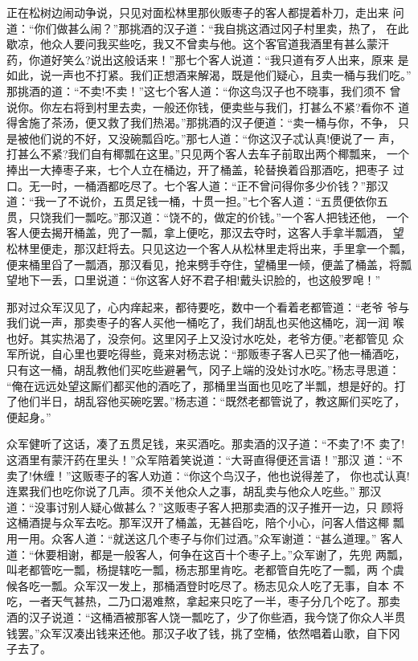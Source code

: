 正在松树边闹动争说，只见对面松林里那伙贩枣子的客人都提着朴刀，走出来
问道：“你们做甚么闹？”那挑酒的汉子道：“我自挑这酒过冈子村里卖，热了，
在此歇凉，他众人要问我买些吃，我又不曾卖与他。这个客官道我酒里有甚么蒙汗
药，你道好笑么?说出这般话来！”那七个客人说道：“我只道有歹人出来，原来
是如此，说一声也不打紧。我们正想酒来解渴，既是他们疑心，且卖一桶与我们吃。”
那挑酒的道：“不卖!不卖！”这七个客人道：“你这鸟汉子也不晓事，我们须不
曾说你。你左右将到村里去卖，一般还你钱，便卖些与我们，打甚么不紧?看你不
道得舍施了茶汤，便又救了我们热渴。”那挑酒的汉子便道：“卖一桶与你，不争，
只是被他们说的不好，又没碗瓢舀吃。”那七人道：“你这汉子忒认真!便说了一
声，打甚么不紧?我们自有椰瓢在这里。”只见两个客人去车子前取出两个椰瓢来，
一个捧出一大捧枣子来，七个人立在桶边，开了桶盖，轮替换着舀那酒吃，把枣子
过口。无一时，一桶酒都吃尽了。七个客人道：“正不曾问得你多少价钱？”那汉
道：“我一了不说价，五贯足钱一桶，十贯一担。”七个客人道：“五贯便依你五
贯，只饶我们一瓢吃。”那汉道：“饶不的，做定的价钱。”一个客人把钱还他，
一个客人便去揭开桶盖，兜了一瓢，拿上便吃，那汉去夺时，这客人手拿半瓢酒，
望松林里便走，那汉赶将去。只见这边一个客人从松林里走将出来，手里拿一个瓢，
便来桶里舀了一瓢酒，那汉看见，抢来劈手夺住，望桶里一倾，便盖了桶盖，将瓢
望地下一丢，口里说道：“你这客人好不君子相!戴头识脸的，也这般罗唣！”

那对过众军汉见了，心内痒起来，都待要吃，数中一个看着老都管道：“老爷
爷与我们说一声，那卖枣子的客人买他一桶吃了，我们胡乱也买他这桶吃，润一润
喉也好。其实热渴了，没奈何。这里冈子上又没讨水吃处，老爷方便。”老都管见
众军所说，自心里也要吃得些，竟来对杨志说：“那贩枣子客人已买了他一桶酒吃，
只有这一桶，胡乱教他们买吃些避暑气，冈子上端的没处讨水吃。”杨志寻思道：
“俺在远远处望这厮们都买他的酒吃了，那桶里当面也见吃了半瓢，想是好的。打
了他们半日，胡乱容他买碗吃罢。”杨志道：“既然老都管说了，教这厮们买吃了，
便起身。”

众军健听了这话，凑了五贯足钱，来买酒吃。那卖酒的汉子道：“不卖了!不
卖了!这酒里有蒙汗药在里头！”众军陪着笑说道：“大哥直得便还言语！”那汉
道：“不卖了!休缠！”这贩枣子的客人劝道：“你这个鸟汉子，他也说得差了，
你也忒认真!连累我们也吃你说了几声。须不关他众人之事，胡乱卖与他众人吃些。”
那汉道：“没事讨别人疑心做甚么？”这贩枣子客人把那卖酒的汉子推开一边，只
顾将这桶酒提与众军去吃。那军汉开了桶盖，无甚舀吃，陪个小心，问客人借这椰
瓢用一用。众客人道：“就送这几个枣子与你们过酒。”众军谢道：“甚么道理。”
客人道：“休要相谢，都是一般客人，何争在这百十个枣子上。”众军谢了，先兜
两瓢，叫老都管吃一瓢，杨提辖吃一瓢，杨志那里肯吃。老都管自先吃了一瓢，两
个虞候各吃一瓢。众军汉一发上，那桶酒登时吃尽了。杨志见众人吃了无事，自本
不吃，一者天气甚热，二乃口渴难熬，拿起来只吃了一半，枣子分几个吃了。那卖
酒的汉子说道：“这桶酒被那客人饶一瓢吃了，少了你些酒，我今饶了你众人半贯
钱罢。”众军汉凑出钱来还他。那汉子收了钱，挑了空桶，依然唱着山歌，自下冈
子去了。

